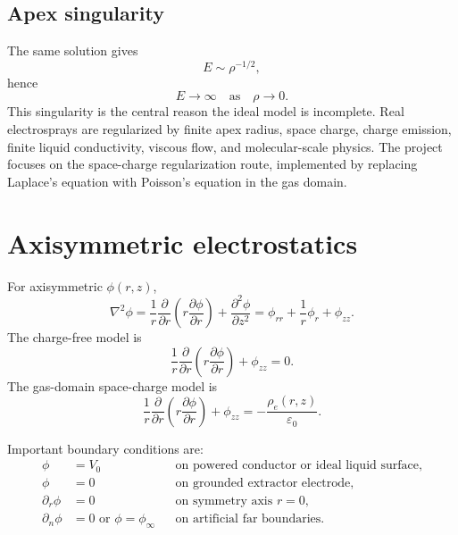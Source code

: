 \documentclass[11pt]{article}
\newcommand{\eps}{\varepsilon}
\begin{document}
\subsection{Apex singularity}

The same solution gives
\begin{equation}
    E\sim \rho^{-1/2},
\end{equation}
hence
\begin{equation}
    E\to\infty\quad\text{as}\quad \rho\to 0.
\end{equation}
This singularity is the central reason the ideal model is incomplete. Real electrosprays are regularized by finite apex radius, space charge, charge emission, finite liquid conductivity, viscous flow, and molecular-scale physics. The project focuses on the space-charge regularization route, implemented by replacing Laplace's equation with Poisson's equation in the gas domain.

\section{Axisymmetric electrostatics}

For axisymmetric \(\phi(r,z)\),
\begin{equation}
    \nabla^2\phi
    =
    \frac{1}{r}\frac{\partial}{\partial r}\left(r\frac{\partial\phi}{\partial r}\right)
    +
    \frac{\partial^2\phi}{\partial z^2}
    =
    \phi_{rr}+\frac{1}{r}\phi_r+\phi_{zz}.
    \label{eq:axi_laplace_operator}
\end{equation}
The charge-free model is
\begin{equation}
    \frac{1}{r}\frac{\partial}{\partial r}\left(r\frac{\partial\phi}{\partial r}\right)
    +
    \phi_{zz}=0.
    \label{eq:laplace_axi}
\end{equation}
The gas-domain space-charge model is
\begin{equation}
    \frac{1}{r}\frac{\partial}{\partial r}\left(r\frac{\partial\phi}{\partial r}\right)
    +
    \phi_{zz}
    =
    -\frac{\rho_e(r,z)}{\eps_0}.
    \label{eq:poisson_axi}
\end{equation}

Important boundary conditions are:
\begin{align}
    \phi &= V_0 &&\text{on powered conductor or ideal liquid surface},\\
    \phi &= 0 &&\text{on grounded extractor electrode},\\
    \partial_r\phi &=0 &&\text{on symmetry axis } r=0,\\
    \partial_n\phi &=0 \text{ or } \phi=\phi_\infty &&\text{on artificial far boundaries}.
\end{align}
\end{document}
